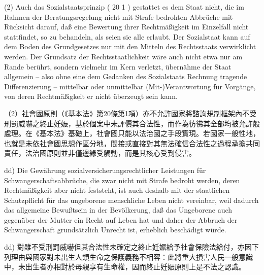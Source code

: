 \documentclass[12pt]{article}
\begin{document}
\begin{sourcepara}[title={原文E.212}]
(2) Auch das Sozialstaatsprinzip (\abbrArt{} 20 \abbrAbs{} 1 \abbrGG{}\ggfnArtTwentyOneDE{}) gestattet es dem Staat nicht, die im Rahmen der Beratungsregelung nicht mit Strafe bedrohten Abbrüche mit Rücksicht darauf, daß eine Bewertung ihrer Rechtmäßigkeit im Einzelfall nicht stattfindet, so zu behandeln, als seien sie alle erlaubt. Der Sozialstaat kann auf dem Boden des Grundgesetzes nur mit den Mitteln des Rechtsstaats verwirklicht werden. Der Grundsatz der Rechtsstaatlichkeit wäre auch nicht etwa nur am Rande berührt, sondern vielmehr im Kern verletzt, übernähme der Staat allgemein -- also ohne eine dem Gedanken des Sozialstaats Rechnung tragende Differenzierung -- mittelbar oder unmittelbar (Mit-)Verantwortung für Vorgänge, von deren Rechtmäßigkeit er nicht überzeugt sein kann.
\end{sourcepara}
\begin{transpara}
（2）社會國原則（《基本法》第20條第1項\ggfnArtTwentyOneZH{}）亦不允許國家將諮詢規制框架內不受刑罰威嚇之終止妊娠，基於個案中未評價其合法性，而作為彷彿其全部均被允許般處理。在《基本法》基礎上，社會國只能以法治國之手段實現。若國家一般性地，也就是未依社會國思想作區分地，間接或直接對其無法確信合法性之過程承擔共同責任，法治國原則並非僅邊緣受觸動，而是其核心受到侵害。
\end{transpara}

\begin{sourcepara}[title={原文E.213}]
dd) Die Gewährung sozialversicherungsrechtlicher Leistungen für Schwangerschaftsabbrüche, die zwar nicht mit Strafe bedroht werden, deren Rechtmäßigkeit aber nicht feststeht, ist auch deshalb mit der staatlichen Schutzpflicht für das ungeborene menschliche Leben nicht vereinbar, weil dadurch das allgemeine Bewußtsein in der Bevölkerung, daß das Ungeborene auch gegenüber der Mutter ein Recht auf Leben hat und daher der Abbruch der Schwangerschaft grundsätzlich Unrecht ist, erheblich beschädigt würde.
\end{sourcepara}
\begin{transpara}
dd) 對雖不受刑罰威嚇但其合法性未確定之終止妊娠給予社會保險法給付，亦因下列理由與國家對未出生人類生命之保護義務不相容：此將重大損害人民一般意識中，未出生者亦相對於母親享有生命權，因而終止妊娠原則上是不法之認識。
\end{transpara}
\end{document}
